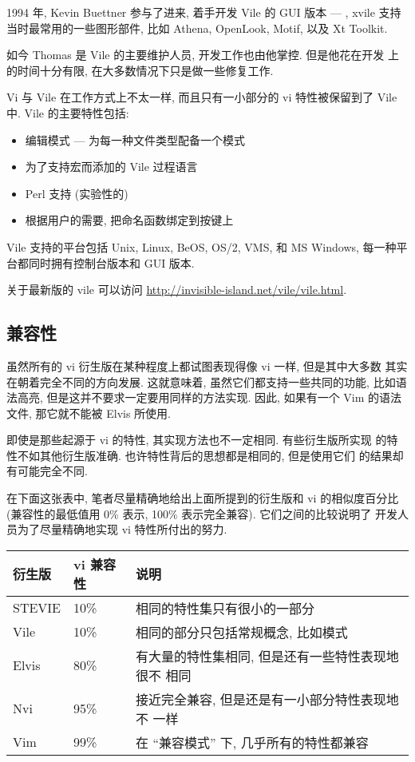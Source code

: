 1994 年, Kevin Buettner 参与了进来, 着手开发 Vile 的 GUI 版本 ---
, xvile 支持当时最常用的一些图形部件, 比如 Athena,
OpenLook, Motif, 以及 Xt Toolkit.

如今 Thomas 是 Vile 的主要维护人员, 开发工作也由他掌控. 但是他花在开发
上的时间十分有限, 在大多数情况下只是做一些修复工作.

Vi 与 Vile 在工作方式上不太一样, 而且只有一小部分的 vi 特性被保留到了
Vile 中. Vile 的主要特性包括:
\begin{itemize}
    \item 编辑模式 --- 为每一种文件类型配备一个模式
    \item 为了支持宏而添加的 Vile  过程语言
    \item Perl 支持 (实验性的)
    \item 根据用户的需要, 把命名函数绑定到按键上
\end{itemize}

Vile 支持的平台包括 Unix, Linux, BeOS, OS/2, VMS, 和 MS Windows,
每一种平台都同时拥有控制台版本和 GUI 版本.
\begin{warning}
    关于最新版的 vile 可以访问
    \url{http://invisible-island.net/vile/vile.html}.
\end{warning}

\subsection{兼容性}
\label{subsec:compatibility}
虽然所有的 vi 衍生版在某种程度上都试图表现得像 vi 一样, 但是其中大多数
其实在朝着完全不同的方向发展. 这就意味着, 虽然它们都支持一些共同的功能,
比如语法高亮, 但是这并不要求一定要用同样的方法实现. 因此, 如果有一个
Vim 的语法文件, 那它就不能被 Elvis 所使用.

即使是那些起源于 vi 的特性, 其实现方法也不一定相同. 有些衍生版所实现
的特性不如其他衍生版准确. 也许特性背后的思想都是相同的, 但是使用它们
的结果却有可能完全不同.

在下面这张表中, 笔者尽量精确地给出上面所提到的衍生版和 vi 的相似度百分比
(兼容性的最低值用 0\% 表示, 100\% 表示完全兼容). 它们之间的比较说明了
开发人员为了尽量精确地实现 vi 特性所付出的努力.

\vspace{0.5em}
\begin{center}
\begin{tabular}{lll}
    \hline
    衍生版  & vi 兼容性 & 说明 \\
    \hline
    STEVIE  & 10\%      & 相同的特性集只有很小的一部分 \\
    Vile    & 10\%      & 相同的部分只包括常规概念, 比如模式 \\
    Elvis   & 80\%      & 有大量的特性集相同, 但是还有一些特性表现地很不
        相同 \\
    Nvi     & 95\%      & 接近完全兼容, 但是还是有一小部分特性表现地不
        一样 \\
    Vim     & 99\%      & 在 ``兼容模式'' 下, 几乎所有的特性都兼容 \\
    \hline
\end{tabular}
\end{center}
\vspace{0.5em}

